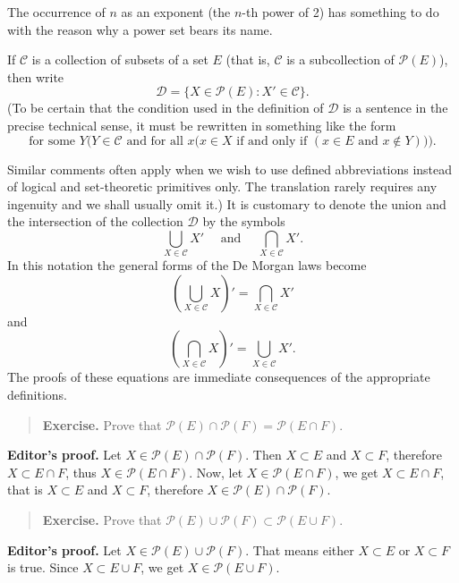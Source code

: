 The occurrence of $n$ as an exponent (the $n$-th power of 2) has something to do with the reason why a power set bears its name.

If $\mathcal{C}$ is a collection of subsets of a set $E$ (that is, $\mathcal{C}$ is a subcollection of $\mathcal{P}(E)$), then write
\[
	\mathcal{D} = \{ X \in \mathcal{P}(E) : X' \in \mathcal{C}\}.
\]
(To be certain that the condition used in the definition of $\mathcal{D}$ is a sentence in the precise technical sense, it must be rewritten in something like the form
\[
	\text{for some } Y \Big( Y \in \mathcal{C} \text{ and for all } x \big(x \in X \text{ if and only if } (x \in E \text{ and } x \not \in Y)\big)\Big).
\]

Similar comments often apply when we wish to use defined abbreviations instead of logical and set-theoretic primitives only. The translation rarely requires any ingenuity and we shall usually omit it.) It is customary to denote the union and the intersection of the collection $\mathcal{D}$ by the symbols
\[
	\bigcup_{X \in \mathcal{C}} X' \quad \text{ and } \quad \bigcap_{X \in \mathcal{C}} X'.
\]
In this notation the general forms of the De Morgan laws become
\[
	\left(\bigcup_{X \in \mathcal{C}} X\right)' = \bigcap_{X \in \mathcal{C}} X'
\]
and
\[
	\left(\bigcap_{X \in \mathcal{C}} X\right)' = \bigcup_{X \in \mathcal{C}} X'.
\]
The proofs of these equations are immediate consequences of the appropriate definitions.

\begin{quote}
	\textbf{Exercise.} Prove that $\mathcal{P}(E) \cap \mathcal{P}(F) = \mathcal{P}(E \cap F)$.
\end{quote}

\textbf{Editor's proof.} Let $X \in \mathcal{P}(E) \cap \mathcal{P}(F)$. Then $X \subset E$ and $X \subset F$, therefore $X \subset E \cap F$, thus $X \in \mathcal{P}(E \cap F)$. Now, let $X \in \mathcal{P}(E \cap F)$, we get $X \subset E \cap F$, that is $X \subset E$ and $X \subset F$, therefore $X \in \mathcal{P}(E) \cap \mathcal{P}(F)$.

\begin{quote}
	\textbf{Exercise.} Prove that $\mathcal{P}(E) \cup \mathcal{P}(F) \subset \mathcal{P}(E \cup F)$.
\end{quote}

\textbf{Editor's proof.} Let $X \in \mathcal{P}(E) \cup \mathcal{P}(F)$. That means either $X \subset E$ or $X \subset F$ is true. Since $X \subset E \cup F$, we get $X \in \mathcal{P}(E \cup F)$.

